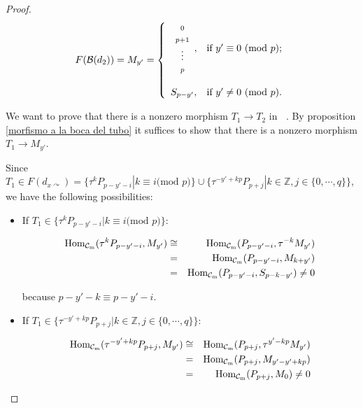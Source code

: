 \documentclass{amsart}
\theoremstyle{plain}
\theoremstyle{definition}
\begin{document}
\begin{proof}
$$F(\mathcal{B}(d_2))= M_{y'}=\left\{
             \begin{array}{ll}
                \begin{array}{c}  \scriptstyle{0} \\ \scriptstyle{p+1} \\ \scriptstyle{\vdots} \\ \scriptstyle{p}  \end{array} , & \hbox{if $y'\equiv 0$ (mod $p$);} \\
                \\
                S_{p-y'}, & \hbox{if $y'\neq 0$ (mod $p$).} \end{array}\right. $$

We want to prove that there is  a nonzero morphism  $T_1\rightarrow T_2$ in ${\mathop{\mathcal{C}_m}\nolimits}$. By   proposition \ref{morfismo a  la boca del tubo} it suffices to show that there is a nonzero morphism  $T_1\rightarrow M_{y'}$.

Since  $T_1\in F(d_{x\curvearrowright})=\{\tau^kP_{p-y'-i} | k\equiv i \text{(mod $p$)} \}\cup \{\tau^{-y'+kp}P_{p+j}| k\in\mathbb{Z}, j\in\{0,\cdots, q\}\}$, we have the following possibilities:

\begin{itemize}
  \item If $T_1\in \{\tau^kP_{p-y'-i}| k\equiv i \text{(mod $p$)}\}$:

\begin{eqnarray*}
{\mathop{\rm Hom_{\mathcal{C}_m}}\nolimits}(\tau^kP_{p-y'-i},M_{y'})& \cong &{\mathop{\rm Hom_{\mathcal{C}_m}}\nolimits}(P_{p-y'-i},\tau^{-k}M_{y'}) \\
& = & {\mathop{\rm Hom_{\mathcal{C}_m}}\nolimits}(P_{p-y'-i},M_{k+y'})\\
& = & {\mathop{\rm Hom_{\mathcal{C}_m}}\nolimits}(P_{p-y'-i}, S_{p-k-y'}) \neq 0
\end{eqnarray*}

 because $p-y'-k\equiv p-y'-i$. \\

  \item If $T_1\in \{\tau^{-y'+kp}P_{p+j}| k\in\mathbb{Z}, j\in\{0,\cdots, q\}\}$:

\begin{eqnarray*}
{\mathop{\rm Hom_{\mathcal{C}_m}}\nolimits}(\tau^{-y'+kp}P_{p+j},M_{y'})& \cong &{\mathop{\rm Hom_{\mathcal{C}_m}}\nolimits}(P_{p+j},\tau^{y'-kp}M_{y'}) \\
& = & {\mathop{\rm Hom_{\mathcal{C}_m}}\nolimits}(P_{p+j},M_{y'-y'+kp})\\
& = & {\mathop{\rm Hom_{\mathcal{C}_m}}\nolimits}(P_{p+j},M_0)\neq 0
\end{eqnarray*}


\end{itemize}
\end{proof}
\end{document}
